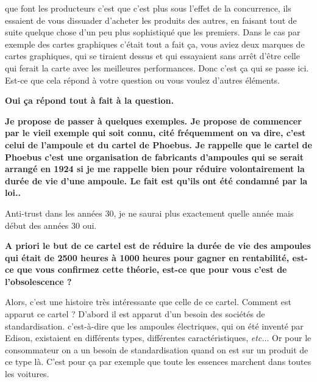 \begin{small}
que font les producteurs c'est que c'est plus sous l'effet de la concurrence, ils essaient de vous dissuader d'acheter les produits des autres, en faisant tout de suite quelque chose d'un peu plus sophistiqué que les premiers. Dans le cas par exemple des cartes graphiques c'était tout a fait ça, vous aviez deux marques de cartes graphiques, qui se tiraient dessus et qui essayaient sans arrêt d'être celle qui ferait la carte avec les meilleures performances. Donc c'est ça qui se passe ici. Est-ce que cela répond à votre question ou vous voulez d'autres éléments.

\smallbreak\textbf{Oui ça répond tout à fait à la question.
}\smallbreak


\smallbreak\textbf{Je propose de passer à quelques exemples. Je propose de commencer par le vieil exemple qui soit connu, cité fréquemment on va dire, c'est celui de l'ampoule et du cartel de Phoebus. Je rappelle que le cartel de Phoebus c'est une organisation de fabricants d'ampoules qui se serait arrangé en 1924 si je me rappelle bien pour réduire volontairement la durée de vie d'une ampoule. Le fait est qu'ils ont été condamné par la loi..
}\smallbreak


Anti-trust dans les années 30, je ne saurai plus exactement quelle année mais début des années 30 oui. 


\smallbreak\textbf{A priori le but de ce cartel est de réduire la durée de vie des ampoules qui était de 2500 heures à 1000 heures pour gagner en rentabilité, est-ce que vous confirmez cette théorie, est-ce que pour vous c'est de l'obsolescence ?}\smallbreak

Alors, c'est une histoire très intéressante que celle de ce cartel. Comment est apparut ce cartel ? D'abord il est apparut d'un besoin des sociétés de standardisation. c'est-à-dire que les ampoules électriques, qui on été inventé par Edison, existaient en différents types, différentes caractéristiques, \textit{etc.}..
Or pour le consommateur on a un besoin de standardisation quand on est sur un produit de ce type là. C'est pour ça par exemple que toute les essences marchent dans toutes les voitures.


\end{small}
